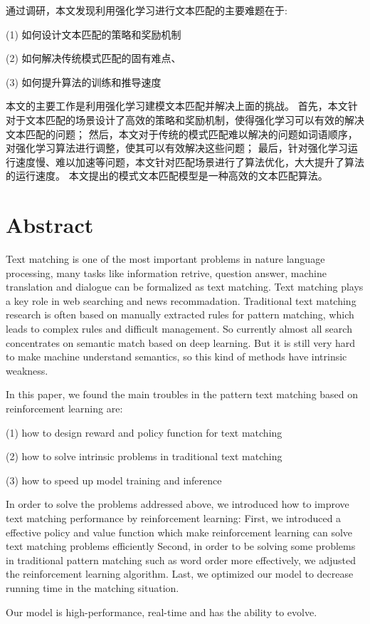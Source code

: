 通过调研，本文发现利用强化学习进行文本匹配的主要难题在于:

(1) 如何设计文本匹配的策略和奖励机制

(2) 如何解决传统模式匹配的固有难点、

(3) 如何提升算法的训练和推导速度

本文的主要工作是利用强化学习建模文本匹配并解决上面的挑战。
首先，本文针对于文本匹配的场景设计了高效的策略和奖励机制，使得强化学习可以有效的解决文本匹配的问题；
然后，本文对于传统的模式匹配难以解决的问题如词语顺序，对强化学习算法进行调整，使其可以有效解决这些问题；
最后，针对强化学习运行速度慢、难以加速等问题，本文针对匹配场景进行了算法优化，大大提升了算法的运行速度。
本文提出的模式文本匹配模型是一种高效的文本匹配算法。

\chapter*{Abstract}

Text matching is one of the most important problems in nature language processing, many tasks like information retrive, question answer, machine translation and dialogue can be formalized as text matching.
Text matching plays a key role in web searching and news recommadation.
Traditional text matching research is often based on manually extracted rules for pattern matching, which leads to complex rules and difficult management. So currently almost all search concentrates on semantic match based on deep learning. But it is still very hard to make machine understand semantics, so this kind of methods have intrinsic weakness.

In this paper, we found the main troubles in the pattern text matching based on reinforcement learning are:

(1) how to design reward and policy function for text matching

(2) how to solve intrinsic problems in traditional text matching

(3) how to speed up model training and inference

In order to solve the problems addressed above, we introduced how to improve text matching performance by reinforcement learning:
First, we introduced a effective policy and value function which make reinforcement learning can solve text matching problems efficiently
Second, in order to be solving some problems in traditional pattern matching such as word order more effectively, we adjusted the reinforcement learning algorithm.
Last, we optimized our model to decrease running time in the matching situation.

Our model is high-performance, real-time and has the ability to evolve.

